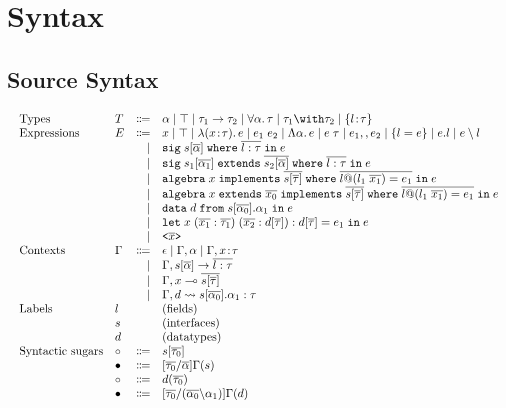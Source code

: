 \documentclass[a4paper]{article}
\begin{document}
\section{Syntax}

\subsection{Source Syntax}

\begin{displaymath}
    \begin{array}{l}
      \begin{array}{llrl}
        \text{Types}
        & T & \Coloneqq & \alpha \mid \top \mid \tau_1 \to \tau_2 \mid \for \alpha \tau \mid \tau_1 \andop \tau_2 \mid \recty l \tau \\
        \text{Expressions}
        & E & \Coloneqq & x \mid \top \mid \lam x \tau e \mid \app {e_1} {e_2} \mid \blam \alpha e \mid \tapp e \tau \mid e_1 \mergeop e_2 \mid \reccon l e \mid e.l \mid e \restrictop l \\
        &   & \mid & \sig s \alpha l \tau e \\
        &   & \mid & \sigext {s_1} {\alpha_1} {s_2} \alpha l \tau e \\
        &   & \mid & \alg x s \tau l {l_1} {x_1} {e_1} e \\
        &   & \mid & \algext x {x_0} s \tau l {l_1} {x_1} {e_1} e \\
        &   & \mid & \data d s {\alpha_0} {\alpha_1} e \\
        &   & \mid & \letexpr {x \; (\overline{x_1} : \overline{\tau_1}) \; (\overline{x_2} : d[\overline{\tau}]) : d[\overline{\tau}]} {e_1} e \\
        &   & \mid & \texttt{<}\overline{x}\texttt{>} \\
        \text{Contexts} & \Gamma & \Coloneqq & \epsilon \mid \Gamma, \alpha \mid \Gamma, x \hast \tau \\
        &   & \mid & \Gamma, s {[} \overline{\alpha} {]}\to\overline{l:\tau} \\
        &   & \mid & \Gamma, x \multimap \overline{s[\overline{\tau}]} \\
        &   & \mid & \Gamma, d \rightsquigarrow s[\overline{\alpha_0}].\alpha_1 : \tau \\
        \text{Labels} & l &  & \text{(fields)} \\
        & s &  & \text{(interfaces)} \\
        & d &  & \text{(datatypes)}\\
        \text{Syntactic sugars} & \circ & \Coloneqq & s[\overline{\tau_0}] \\
        & \bullet & \Coloneqq & [\overline{\tau_0}/\overline{\alpha}]\Gamma(s) \\
        & \circ & \Coloneqq & d(\overline{\tau_0}) \\
        & \bullet & \Coloneqq & [\overline{\tau_0}/(\overline{\alpha_0}\backslash\alpha_1)]\Gamma(d)
      \end{array}
    \end{array}
\end{displaymath}
\end{document}
